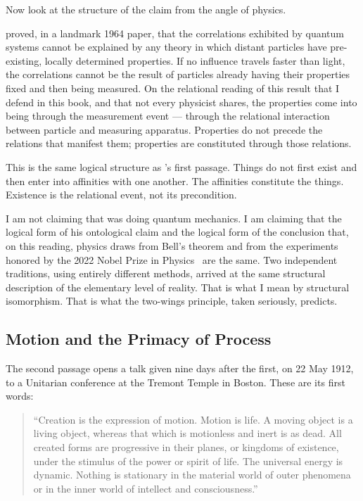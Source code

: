 Now look at the structure of the claim from the angle of physics.

\citet{Bell1964} proved, in a landmark 1964 paper, that the correlations
exhibited by quantum systems cannot be explained by any theory in which
distant particles have pre-existing, locally determined properties.
If no influence travels faster than light, the correlations cannot be the
result of particles already having their properties fixed and then being
measured.
On the relational reading of this result that I defend in this book, and that
not every physicist shares, the properties come into being through the
measurement event --- through the relational interaction between particle and
measuring apparatus.
Properties do not precede the relations that manifest them;
properties are constituted through those relations.

This is the same logical structure as \AbdulBaha's first passage.
Things do not first exist and then enter into affinities with one another.
The affinities constitute the things.
Existence is the relational event, not its precondition.

I am not claiming that \AbdulBaha was doing quantum mechanics.
I am claiming that the logical form of his ontological claim and the logical
form of the conclusion that, on this reading, physics draws from Bell's
theorem and from the experiments honored by the 2022 Nobel Prize in
Physics~\citep{Aspect1982} are the same.
Two independent traditions, using entirely different methods, arrived at
the same structural description of the elementary level of reality.
That is what I mean by structural isomorphism.
That is what the two-wings principle, taken seriously, predicts.

\subsection{Motion and the Primacy of Process}
\label{subsec:ch3-passage2}

The second passage opens a talk given nine days after the first, on 22 May
1912, to a Unitarian conference at the Tremont Temple in Boston.
These are its first words:

\begin{quote}
``Creation is the expression of motion. Motion is life. A moving object
is a living object, whereas that which is motionless and inert is as dead.
All created forms are progressive in their planes, or kingdoms of
existence, under the stimulus of the power or spirit of life. The
universal energy is dynamic. Nothing is stationary in the material world
of outer phenomena or in the inner world of intellect and consciousness.''
\citep[Talk 52]{PUP}
\end{quote}


